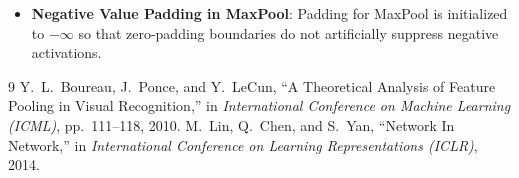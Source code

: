 \documentclass[11pt,a4paper]{article}
\theoremstyle{definition}
\begin{document}
\begin{itemize}
    \item \textbf{Negative Value Padding in MaxPool}: Padding for MaxPool is initialized to $-\infty$ so that zero-padding boundaries do not artificially suppress negative activations.
\end{itemize}

\begin{thebibliography}{9}
 Y.~L.~Boureau, J.~Ponce, and Y.~LeCun, ``A Theoretical Analysis of Feature Pooling in Visual Recognition,'' in \emph{International Conference on Machine Learning (ICML)}, pp.~111--118, 2010.
 M.~Lin, Q.~Chen, and S.~Yan, ``Network In Network,'' in \emph{International Conference on Learning Representations (ICLR)}, 2014.
\end{thebibliography}
\end{document}

